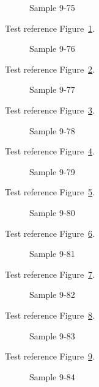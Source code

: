 \begin{figure}[tbhp]
\caption{Sample 9-75}
\label{fig:sample-9-75}
\end{figure}

Test reference Figure~\ref{fig:sample-9-75}.

\begin{figure}[tbhp]
\caption{Sample 9-76}
\label{fig:sample-9-76}
\end{figure}

Test reference Figure~\ref{fig:sample-9-76}.

\begin{figure}[tbhp]
\caption{Sample 9-77}
\label{fig:sample-9-77}
\end{figure}

Test reference Figure~\ref{fig:sample-9-77}.

\begin{figure}[tbhp]
\caption{Sample 9-78}
\label{fig:sample-9-78}
\end{figure}

Test reference Figure~\ref{fig:sample-9-78}.

\begin{figure}[tbhp]
\caption{Sample 9-79}
\label{fig:sample-9-79}
\end{figure}

Test reference Figure~\ref{fig:sample-9-79}.

\begin{figure}[tbhp]
\caption{Sample 9-80}
\label{fig:sample-9-80}
\end{figure}

Test reference Figure~\ref{fig:sample-9-80}.

\begin{figure}[tbhp]
\caption{Sample 9-81}
\label{fig:sample-9-81}
\end{figure}

Test reference Figure~\ref{fig:sample-9-81}.

\begin{figure}[tbhp]
\caption{Sample 9-82}
\label{fig:sample-9-82}
\end{figure}

Test reference Figure~\ref{fig:sample-9-82}.

\begin{figure}[tbhp]
\caption{Sample 9-83}
\label{fig:sample-9-83}
\end{figure}

Test reference Figure~\ref{fig:sample-9-83}.

\begin{figure}[tbhp]
\caption{Sample 9-84}
\label{fig:sample-9-84}
\end{figure}


